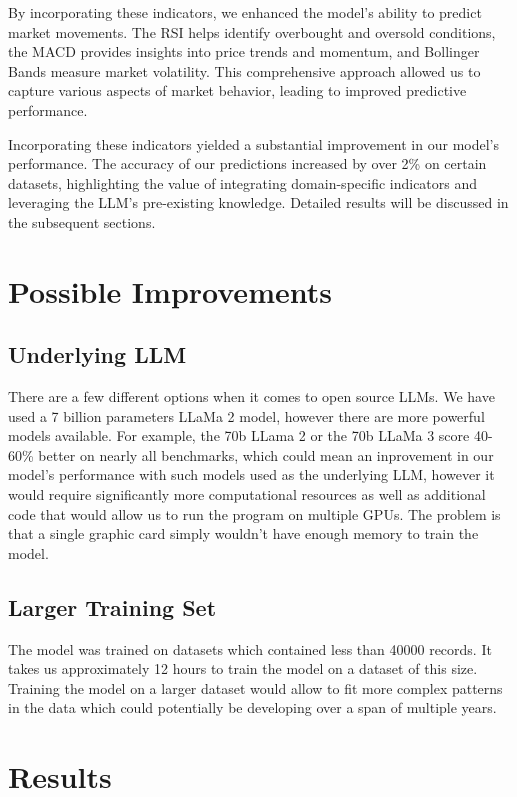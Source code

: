By incorporating these indicators, we enhanced the model's ability to predict market movements. The RSI helps identify overbought and oversold conditions, the MACD provides insights into price trends and momentum, and Bollinger Bands measure market volatility. This comprehensive approach allowed us to capture various aspects of market behavior, leading to improved predictive performance.

Incorporating these indicators yielded a substantial improvement in our model's performance. The accuracy of our predictions increased by over 2\% on certain datasets, highlighting the value of integrating domain-specific indicators and leveraging the LLM's pre-existing knowledge. Detailed results will be discussed in the subsequent sections.

\section{Possible Improvements}

\subsection{Underlying LLM}
There are a few different options when it comes to open source LLMs. We have used a 7 billion parameters LLaMa 2 model, however there are more powerful models available. For example, the 70b LLama 2 or the 70b LLaMa 3 score 40-60\% better on nearly all benchmarks, which could mean an inprovement in our model's performance with such models used as the underlying LLM, however it would require significantly more computational resources as well as additional code that would allow us to run the program on multiple GPUs. The problem is that a single graphic card simply wouldn't have enough memory to train the model.

\subsection{Larger Training Set}
The model was trained on datasets which contained less than 40000 records. It takes us approximately 12 hours to train the model on a dataset of this size. Training the model on a larger dataset would allow to fit more complex patterns in the data which could potentially be developing over a span of multiple years.

\section{Results}

